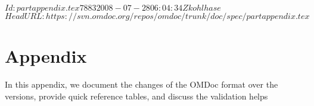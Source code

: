 \svnInfo $Id: partappendix.tex 7883 2008-07-28 06:04:34Z kohlhase $
\svnKeyword $HeadURL: https://svn.omdoc.org/repos/omdoc/trunk/doc/spec/partappendix.tex $

\part{Appendix}\label{part:appendix}
  In this appendix, we document the changes of the OMDoc format over the versions,
  provide quick reference tables, and discuss the validation helps


